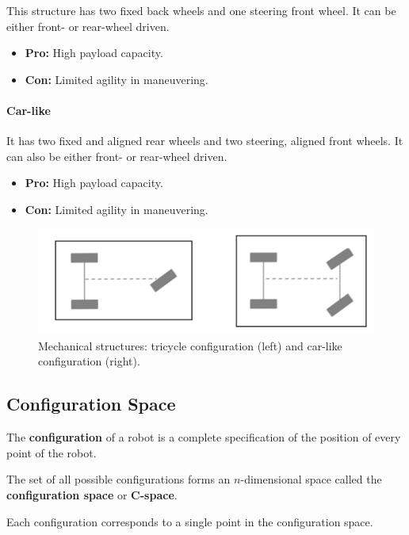 This structure has two fixed back wheels and one steering front wheel. It can be either front- or rear-wheel driven.

\begin{itemize}
  \item \textbf{Pro:} High payload capacity.
  \item \textbf{Con:} Limited agility in maneuvering.
\end{itemize}

\paragraph{Car-like} \hfill

It has two fixed and aligned rear wheels and two steering, aligned front wheels. It can also be either front- or rear-wheel driven.

\begin{itemize}
  \item \textbf{Pro:} High payload capacity.
  \item \textbf{Con:} Limited agility in maneuvering.
\end{itemize}

\begin{figure}[H]
  \centering
  \includegraphics[width=0.85\linewidth]{imgs/tricycle_car_like.png}
  \caption{Mechanical structures: tricycle configuration (left) and car-like configuration (right).}
\end{figure}

\hfill

\subsection{Configuration Space}

The \textbf{configuration} of a robot is a complete specification of the position of every point of the robot.

The set of all possible configurations forms an $n$-dimensional space called the \textbf{configuration space} or \textbf{C-space}.

Each configuration corresponds to a single point in the configuration space.

